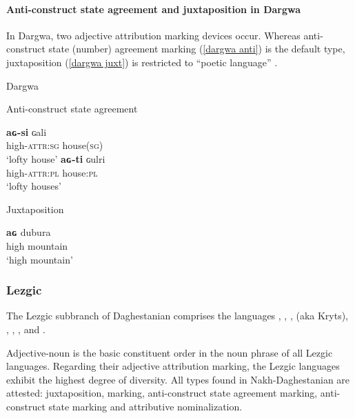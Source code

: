 \paragraph*{Anti\hyp{}construct state agreement and juxtaposition in Dargwa}
In Dargwa, two adjective attribution marking devices occur. Whereas anti\hyp{}construct state (number) agreement marking (\ref{dargwa anti}) is the default type, juxtaposition (\ref{dargwa juxt}) is restricted to “poetic language” \citep[318]{isaev2004}.
\begin{exe}
\ex 
\rm{Dargwa \citep[318]{isaev2004}}
\begin{xlist}
\ex 
\label{dargwa anti}
\rm{Anti\hyp{}construct state agreement} 
\begin{xlist}
\ex
\gll	\textbf{aɢ-si} ɢali\\
	high-\textsc{attr:sg} house(\textsc{sg})\\
\glt	‘lofty house’
\ex
\gll	\textbf{aɢ-ti} ɢulri\\
	high-\textsc{attr:pl} house:\textsc{pl}\\
\glt	‘lofty houses’
\end{xlist}

\ex
\label{dargwa juxt}
\rm{Juxtaposition}
\begin{xlist}
\ex
\gll	\textbf{aɢ} dubura\\
	high mountain\\
\glt	‘high mountain’
\end{xlist}
\end{xlist}
\end{exe}

\subsubsection{Lezgic}
\label{lezgian synchr}
The Lezgic subbranch of Daghestanian comprises the languages , , ,  (aka Kryts), , , ,  and .

Adjective-noun is the basic constituent order in the noun phrase of all Lezgic languages. Regarding their adjective attribution marking, the Lezgic languages exhibit the highest degree of diversity. All types found in Nakh-Daghestanian are attested: juxtaposition,  marking, anti\hyp{}construct state agreement marking, anti\hyp{}construct state marking and attributive nominalization.

